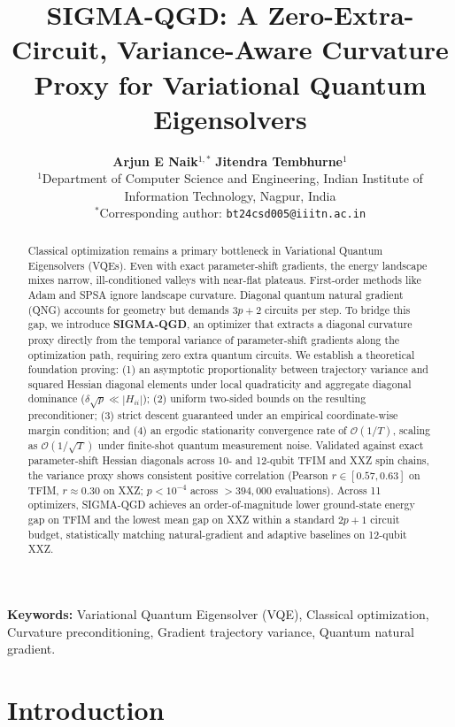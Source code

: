 \documentclass[11pt,a4paper]{article}
\title{\textbf{SIGMA-QGD: A Zero-Extra-Circuit, Variance-Aware Curvature Proxy for Variational Quantum Eigensolvers}}
\author{
    \textbf{Arjun E Naik}$^{1,*}$ \quad \textbf{Jitendra Tembhurne}$^{1}$ \\[1ex]
    $^{1}$Department of Computer Science and Engineering, Indian Institute of Information Technology, Nagpur, India \\
    $^{*}$Corresponding author: \texttt{bt24csd005@iiitn.ac.in}
}
\date{}
\begin{document}
\maketitle

\begin{abstract}
Classical optimization remains a primary bottleneck in Variational Quantum Eigensolvers (VQEs). Even with exact parameter-shift gradients, the energy landscape mixes narrow, ill-conditioned valleys with near-flat plateaus. First-order methods like Adam and SPSA ignore landscape curvature. Diagonal quantum natural gradient (QNG) accounts for geometry but demands $3p+2$ circuits per step. To bridge this gap, we introduce \textbf{SIGMA-QGD}, an optimizer that extracts a diagonal curvature proxy directly from the temporal variance of parameter-shift gradients along the optimization path, requiring zero extra quantum circuits. We establish a theoretical foundation proving: (1) an asymptotic proportionality between trajectory variance and squared Hessian diagonal elements under local quadraticity and aggregate diagonal dominance ($\delta\sqrt{p} \ll |H_{ii}|$); (2) uniform two-sided bounds on the resulting preconditioner; (3) strict descent guaranteed under an empirical coordinate-wise margin condition; and (4) an ergodic stationarity convergence rate of $\mathcal{O}(1/T)$, scaling as $\mathcal{O}(1/\sqrt{T})$ under finite-shot quantum measurement noise. Validated against exact parameter-shift Hessian diagonals across 10- and 12-qubit TFIM and XXZ spin chains, the variance proxy shows consistent positive correlation (Pearson $r \in [0.57, 0.63]$ on TFIM, $r \approx 0.30$ on XXZ; $p < 10^{-4}$ across $>394{,}000$ evaluations). Across 11 optimizers, SIGMA-QGD achieves an order-of-magnitude lower ground-state energy gap on TFIM and the lowest mean gap on XXZ within a standard $2p+1$ circuit budget, statistically matching natural-gradient and adaptive baselines on 12-qubit XXZ.
\end{abstract}

\textbf{Keywords:} Variational Quantum Eigensolver (VQE), Classical optimization, Curvature preconditioning, Gradient trajectory variance, Quantum natural gradient.

\newpage

\section{Introduction}
\label{sec:intro}
\end{document}

